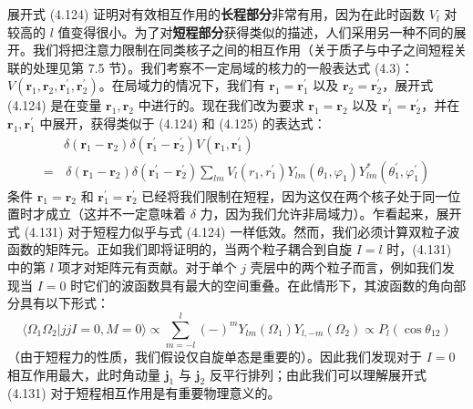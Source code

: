 展开式 (4.124) 证明对有效相互作用的\textbf{长程部分}非常有用，因为在此时函数 $V_{l}$ 对较高的 $l$
值变得很小。为了对\textbf{短程部分}获得类似的描述，人们采用另一种不同的展开。我们将把注意力限制在同类核子之间的相互作用（关于质子与中子之间短程关联的处理见第
7.5 节）。我们考察不一定局域的核力的一般表达式 (4.3)：$V(\boldsymbol{r}_{1},\boldsymbol{r}_{2},\boldsymbol{r}^{\prime}_{1},\boldsymbol{r}^{\prime}_{2})$。在局域力的情况下，我们有
$\boldsymbol{r}_{1}=\boldsymbol{r}^{\prime}_{1}$ 以及 $\boldsymbol{r}_{2}=\boldsymbol{r}^{\prime}_{2}$，展开式
(4.124) 是在变量 $\boldsymbol{r}_{1},\boldsymbol{r}_{2}$ 中进行的。现在我们改为要求
$\boldsymbol{r}_{1}=\boldsymbol{r}_{2}$ 以及 $\boldsymbol{r}^{\prime}_{1}=\boldsymbol{r}^{\prime}_{2}$，并在
$\boldsymbol{r}_{1},\boldsymbol{r}^{\prime}_{1}$ 中展开，获得类似于 (4.124)
和 (4.125) 的表达式：
\begin{align}
 & \delta(\boldsymbol{r}_{1}-\boldsymbol{r}_{2})\delta(\boldsymbol{r}^{\prime}_{1}-\boldsymbol{r}^{\prime}_{2})V(\boldsymbol{r}_{1},\boldsymbol{r}^{\prime}_{1})\nonumber \\
= & \,\delta(\boldsymbol{r}_{1}-\boldsymbol{r}_{2})\delta(\boldsymbol{r}^{\prime}_{1}-\boldsymbol{r}^{\prime}_{2})\sum_{lm}V_{l}(r_{1},r^{\prime}_{1})Y_{lm}(\theta_{1},\varphi_{1})Y^{*}_{lm}(\theta^{\prime}_{1},\varphi^{\prime}_{1})\label{eq:4.131}
\end{align}
条件 $\boldsymbol{r}_{1}=\boldsymbol{r}_{2}$ 和 $\boldsymbol{r}^{\prime}_{1}=\boldsymbol{r}^{\prime}_{2}$
已经将我们限制在短程，因为这仅在两个核子处于同一位置时才成立（这并不一定意味着 $\delta$ 力，因为我们允许非局域力）。乍看起来，展开式
(4.131) 对于短程力似乎与式 (4.124) 一样低效。然而，我们必须计算双粒子波函数的矩阵元。正如我们即将证明的，当两个粒子耦合到自旋
$I=l$ 时，(4.131) 中的第 $l$ 项才对矩阵元有贡献。对于单个 $j$ 壳层中的两个粒子而言，例如我们发现当 $I=0$
时它们的波函数具有最大的空间重叠。在此情形下，其波函数的角向部分具有以下形式：
\begin{equation}
\langle\Omega_{1}\Omega_{2}|jjI=0,M=0\rangle\propto\sum^{l}_{m=-l}(-)^{m}Y_{lm}(\Omega_{1})Y_{l,-m}(\Omega_{2})\propto P_{l}(\cos\theta_{12})\label{eq:4.132}
\end{equation}
（由于短程力的性质，我们假设仅自旋单态是重要的）。因此我们发现对于 $I=0$ 相互作用最大，此时角动量 $\boldsymbol{j}_{1}$
与 $\boldsymbol{j}_{2}$ 反平行排列；由此我们可以理解展开式 (4.131) 对于短程相互作用是有重要物理意义的。

